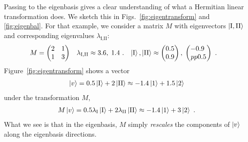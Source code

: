 \documentclass[12pt, oneside]{report}    %
\begin{document}
Passing to the eigenbasis gives a clear understanding of what a Hermitian linear transformation does. We sketch this in Figs.~\ref{fig:eigentransform} and \ref{fig:eigenbal}. For that example, we consider a matrix $M$ with eigenvectors $\left|{\textnormal{I},\textnormal{II}}\right\rangle$ and corresponding eigenvalues $\lambda_{\text{I},\text{II}}$:
\begin{align}
    M &= \begin{pmatrix}
        2 & 1 \\
        1 & 3
    \end{pmatrix}
    &
    \lambda_{\textnormal{I},\textnormal{II}} &\approx 3.6,\; 1.4 \ .
    &
    \left|\textnormal{I}\right\rangle,\left|\textnormal{II}\right\rangle&\approx
    \begin{pmatrix}
        0.5 \\ 0.9
    \end{pmatrix},
    \;
    \begin{pmatrix}
        -0.9 \ \\pp 0.5
    \end{pmatrix} \ .
\end{align}
Figure~\ref{fig:eigentransform} shows a vector 
\begin{align}
    \left|v\right\rangle = 0.5\left|\textnormal{I}\right\rangle + 2\left|\textnormal{II}\right\rangle \approx
    -1.4\left|1\right\rangle + 1.5 \left|2\right\rangle 
    \label{eq:eigen:example:v}
\end{align}
under the transformation $M$,
\begin{align}
    M\left|v\right\rangle = 0.5\lambda_\textnormal{I}\left|\textnormal{I}\right\rangle + 2 \lambda_\textnormal{II}\left|\textnormal{II}\right\rangle \approx
    -1.4\left|1\right\rangle + 3 \left|2\right\rangle \ .
    \label{eq:eigen:example:Mv}
\end{align}
What we see is that in the eigenbasis, $M$ simply \emph{rescales} the components of $\left|v\right\rangle$ along the eigenbasis directions. 
\end{document}
